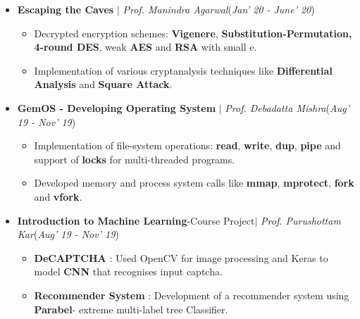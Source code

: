 \documentclass[10pt]{extarticle}
\begin{document}
\begin{itemize}
\item \textbf{Escaping the Caves} $|$ \textit{Prof. Manindra Agarwal}\hfill(\textit{Jan' 20 - June' 20})
\begin{itemize}
    \item Decrypted encryption schemes: \textbf{Vigenere}, \textbf{Substitution-Permutation,} \textbf{4-round DES}, weak \textbf{AES} and \textbf{RSA} with small e.
    \item Implementation of various cryptanalysis techniques like \textbf{Differential Analysis} and \textbf{Square Attack}.
\end{itemize}
\item \textbf{GemOS - Developing Operating System} $|$ \textit{Prof. Debadatta Mishra}\hfill(\textit{Aug' 19 - Nov' 19})
\begin{itemize}
    \item Implementation of file-system operations: \textbf{read}, \textbf{write}, \textbf{dup}, \textbf{pipe} and support of \textbf{locks} for multi-threaded programs.
    \item Developed memory and process system calls like \textbf{mmap}, \textbf{mprotect}, 
    \textbf{fork} and \textbf{vfork}. 
\end{itemize}

\item \textbf{Introduction to Machine Learning}-Course Project$|$ \textit{Prof. Purushottam Kar}\hfill(\textit{Aug' 19 - Nov' 19})

\begin{itemize}
    \item \textbf{DeCAPTCHA} : Used OpenCV for image processing and Keras to model \textbf{CNN} that recognises input captcha.
    \item \textbf{Recommender System} : Development of a recommender system using \textbf{Parabel}- extreme multi-label tree Classifier.
\end{itemize}
\end{itemize}
\end{document}
